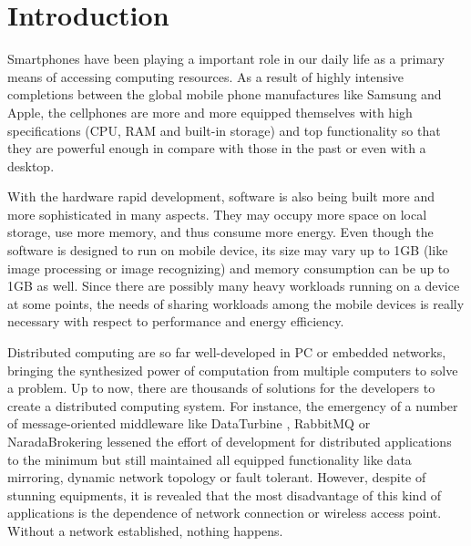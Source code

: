 \documentclass[conference]{IEEEtran}
\begin{document}
%
\IEEEpeerreviewmaketitle



\section{Introduction}
Smartphones have been playing a important role in our daily life as a primary means of accessing computing resources. As a result of highly intensive completions between the global mobile phone manufactures like Samsung and Apple, the cellphones are more and more equipped themselves with high specifications (CPU, RAM and built-in storage) and top functionality so that they are powerful enough in compare with those in the past or even with a desktop. 

With the hardware rapid development, software is also being built more and more sophisticated in many aspects. They may occupy more space on local storage, use more memory, and thus consume more energy. Even though the software is designed to run on mobile device, its size may vary up to 1GB (like image processing or image recognizing) and memory consumption can be up to 1GB as well. Since there are possibly many heavy workloads running on a device at some points, the needs of sharing workloads among the mobile devices is really necessary with respect to performance and energy efficiency. 

Distributed computing are so far well-developed in PC or embedded networks, bringing the synthesized power of computation from multiple computers to solve a problem. Up to now, there are thousands of solutions for the developers to create a distributed computing system. For instance, the emergency of a number of message-oriented middleware like DataTurbine \cite{rbnb}, RabbitMQ \cite{rabbitmq} or NaradaBrokering \cite{naradabrokering} lessened the effort of development for distributed applications to the minimum but still maintained all equipped functionality like data mirroring, dynamic network topology or fault tolerant. However, despite of stunning equipments, it is revealed that the most disadvantage of this kind of applications is the dependence of network connection or wireless access point. Without a network established, nothing happens.
\end{document}
